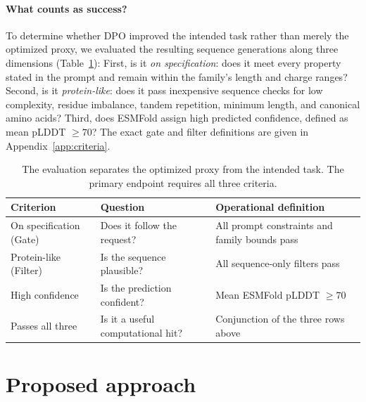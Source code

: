 \documentclass{article}
\begin{document}
\paragraph{What counts as success?}
To determine whether DPO improved the intended task rather than merely the optimized proxy, we evaluated the resulting sequence generations along three dimensions (Table~\ref{tab:criteria-simple}): First, is it \emph{on specification}: does it meet every property stated in the prompt and remain within the family's length and
charge ranges? Second, is it \emph{protein-like}: does it pass inexpensive
sequence checks for low complexity, residue imbalance, tandem repetition,
minimum length, and canonical amino acids? Third, does ESMFold assign high
predicted confidence, defined as mean pLDDT $\geq 70$? The exact gate and filter
definitions are given in Appendix~\ref{app:criteria}. 

\begin{table}[t]
\caption{The evaluation separates the optimized proxy from the intended task.
The primary endpoint requires all three criteria.}
\label{tab:criteria-simple}
\centering
\small
\setlength{\tabcolsep}{5pt}
\begin{tabular}{@{}lll@{}}
\toprule
Criterion & Question & Operational definition \\
\midrule
On specification (Gate) & Does it follow the request? & All prompt constraints and family bounds pass \\
Protein-like (Filter) & Is the sequence plausible? & All sequence-only filters pass \\
High confidence & Is the prediction confident? & Mean ESMFold pLDDT $\geq 70$ \\
\midrule
Passes all three & Is it a useful computational hit? & Conjunction of the three rows above \\
\bottomrule
\end{tabular}
\end{table}


\section{Proposed approach}
\label{sec:approach}
\end{document}
